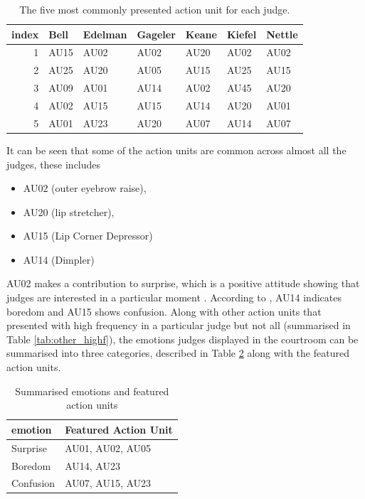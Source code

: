 \documentclass{monashthesis}
\begin{document}
\begin{table}[t]

\caption{\label{tab:unnamed-chunk-5}\label{tab:most_common}The five most commonly presented action unit for each judge.}
\centering
\begin{tabular}{r|l|l|l|l|l|l}
\hline
index & Bell & Edelman & Gageler & Keane & Kiefel & Nettle\\
\hline
1 & AU15 & AU02 & AU02 & AU20 & AU02 & AU02\\
\hline
2 & AU25 & AU20 & AU05 & AU15 & AU25 & AU15\\
\hline
3 & AU09 & AU01 & AU14 & AU02 & AU45 & AU20\\
\hline
4 & AU02 & AU15 & AU15 & AU14 & AU20 & AU01\\
\hline
5 & AU01 & AU23 & AU20 & AU07 & AU14 & AU07\\
\hline
\end{tabular}
\end{table}

It can be seen that some of the action units are common across almost all the judges, these includes

\begin{itemize}
\tightlist
\item
  AU02 (outer eyebrow raise),
\item
  AU20 (lip stretcher),
\item
  AU15 (Lip Corner Depressor)
\item
  AU14 (Dimpler)
\end{itemize}

AU02 makes a contribution to surprise, which is a positive attitude showing that judges are interested in a particular moment \autocite{ekman2002facial}. According to \autocite{ekman2002facial}, AU14 indicates boredom and AU15 shows confusion. Along with other action units that presented with high frequency in a particular judge but not all (summarised in Table \ref{tab:other_highf}), the emotions judges displayed in the courtroom can be summarised into three categories, described in Table \ref{tab:three_category} along with the featured action units.

\begin{table}[t]

\caption{\label{tab:unnamed-chunk-6}\label{tab:three_category} Summarised emotions and featured action units}
\centering
\begin{tabular}{l|l}
\hline
emotion & Featured Action Unit\\
\hline
Surprise & AU01, AU02, AU05\\
\hline
Boredom & AU14, AU23\\
\hline
Confusion & AU07, AU15, AU23\\
\hline
\end{tabular}
\end{table}
\end{document}
